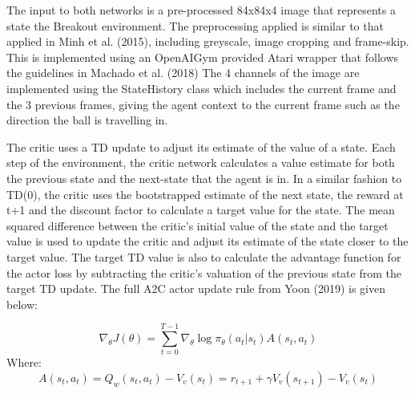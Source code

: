 \documentclass{article}
\begin{document}
The input to both networks is a pre-processed 84x84x4 image that represents a state the Breakout environment. The preprocessing applied is similar to that applied in Minh et al. (2015), including greyscale, image cropping and frame-skip. This is implemented using an OpenAIGym provided Atari wrapper that follows the guidelines in Machado et al. (2018) The 4 channels of the image are implemented using the StateHistory class which includes the current frame and the 3 previous frames, giving the agent context to the current frame such as the direction the ball is travelling in.

The critic uses a TD update to adjust its estimate of the value of a state. Each step of the environment, the critic network calculates a value estimate for both the previous state and the next-state that the agent is in. In a similar fashion to TD(0), the critic uses the bootstrapped estimate of the next state, the reward at t+1 and the discount factor to calculate a target value for the state. The mean squared difference between the critic's initial value of the state and the target value is used to update the critic and adjust its estimate of the state closer to the target value. The target TD value is also to calculate the advantage function for the actor loss by subtracting the critic's valuation of the previous state from the target TD update. The full A2C actor update rule from Yoon (2019) is given below:

\begin{equation}
\nabla_{\theta} J(\theta) = \sum_{t=0}^{T-1}\nabla_{\theta}\log{\pi_{\theta}}(a_{t} | s_{t}) A(s_{t}, a_{t})
\end{equation}
Where:
\begin{equation}
A(s_{t}, a_{t}) = Q_{w}(s_{t}, a_{t}) - V_{v}(s_{t}) = r_{t+1} + \gamma V_{v}(s_{t+1}) - V_{v}(s_{t})
\end{equation}
\end{document}

